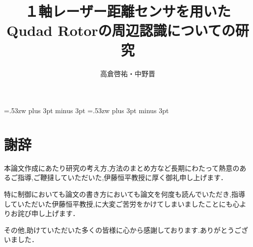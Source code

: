 \documentclass[12pt,oneside]{paper}
\title{１軸レーザー距離センサを用いたQudad Rotorの周辺認識についての研究}
\author{高倉啓祐・中野晋}
\begin{document}
\setlength{\baselineskip}{9truemm}

\kanjiskip=.53zw plus 3pt minus 3pt
\xkanjiskip=.53zw plus 3pt minus 3pt

\tableofcontents



















\chapter*{謝辞}
本論文作成にあたり研究の考え方,方法のまとめ方など長期にわたって熱意のあるご指導,ご鞭撻していただいた,伊藤恒平教授に厚く御礼申し上げます．

特に制御においても論文の書き方においても論文を何度も読んでいただき,指導していただいた伊藤恒平教授,に大変ご苦労をかけてしまいましたことにも心よりお詫び申し上げます．

その他,助けていただいた多くの皆様に心から感謝しております.ありがとうございました．
\end{document}
